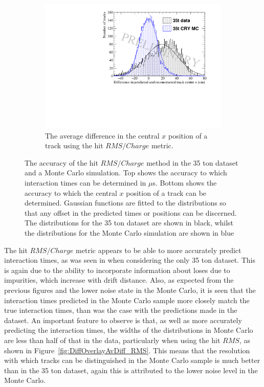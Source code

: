 \begin{figure}
  \begin{subfigure}{0.6\textwidth}
    \centering
    \includegraphics[width=\textwidth]{Overlay_AvXPosDiff_RMS_Int}
    \caption{The average difference in the central $x$ position of a track using the hit $RMS/Charge$ metric.}
    \label{fig:DiffOverlayAvDiff_RMS_Int_X}
  \end{subfigure}
  \caption[Comparing the accuracy of the hit $RMS$ method in the 35 ton dataset and a Monte Carlo simulation]
          {The accuracy of the hit $RMS/Charge$ method in the 35 ton dataset and a Monte Carlo simulation. Top shows the accuracy to which interaction times can be determined in $\mu$s. Bottom shows the accuracy to which the central $x$ position of a track can be determined. Gaussian functions are fitted to the distributions so that any offset in the predicted times or positions can be discerned. The distributions for the 35 ton dataset are shown in black, whilst the distributions for the Monte Carlo simulation are shown in blue}
  \label{fig:DiffOverlayAvDiff_RMS_Int}
\end{figure}

The hit $RMS/Charge$ metric appears to be able to more accurately predict interaction times, as was seen in when considering the only 35 ton dataset. This is again due to the ability to incorporate information about loses due to impurities, which increase with drift distance. Also, as expected from the previous figures and the lower noise state in the Monte Carlo, it is seen that the interaction times predicted in the Monte Carlo sample more closely match the true interaction times, than was the case with the predictions made in the dataset. An important feature to observe is that, as well as more accurately predicting the interaction times, the widths of the distributions in Monte Carlo are less than half of that in the data, particularly when using the hit $RMS$, as shown in Figure~\ref{fig:DiffOverlayAvDiff_RMS}. This means that the resolution with which tracks can be distinguished in the Monte Carlo sample is much better than in the 35 ton dataset, again this is attributed to the lower noise level in the Monte Carlo. \\

